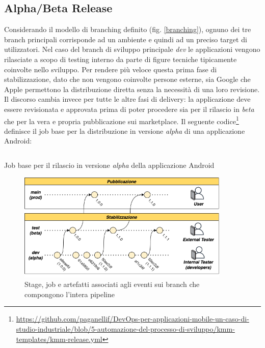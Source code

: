 \subsection{Alpha/Beta Release}
Considerando il modello di branching definito (fig. \ref{branching}), ognuno dei tre branch principali corrisponde ad un ambiente e quindi ad un preciso target di utilizzatori. Nel caso del branch di sviluppo principale \textit{dev} le applicazioni vengono rilasciate a scopo di testing interno da parte di figure tecniche tipicamente coinvolte nello sviluppo. Per rendere più veloce questa prima fase di stabilizzazione, dato che non vengono coinvolte persone esterne, sia Google che Apple permettono la distribuzione diretta senza la necessità di una loro revisione. Il discorso cambia invece per tutte le altre fasi di delivery: la applicazione deve essere revisionata e approvata prima di poter procedere sia per il rilascio in \textit{beta} che per la vera e propria pubblicazione sui marketplace. Il seguente codice\footnote{\href{https://github.com/paganellif/DevOps-per-applicazioni-mobile-un-caso-di-studio-industriale/blob/5-automazione-del-processo-di-sviluppo/kmm-templates/kmm-release.yml}{https://github.com/paganellif/DevOps-per-applicazioni-mobile-un-caso-di-studio-industriale/blob/5-automazione-del-processo-di-sviluppo/kmm-templates/kmm-release.yml}} definisce il job base per la distribuzione in versione \textit{alpha} di una applicazione Android:

\begin{listing}[H]
    \inputminted{yaml}{code/android-alpha-release-job.yaml}
    \caption{Job base per il rilascio in versione \textit{alpha} della applicazione Android}
\end{listing}

\begin{figure}[H]
    \centering
    \includegraphics[width=0.9\textwidth]{img/release-flow.png}
    \caption{Stage, job e artefatti associati agli eventi sui branch che compongono l'intera pipeline}
    \label{release-alpha-beta-flow}
\end{figure}


